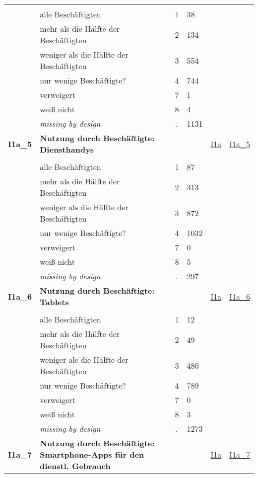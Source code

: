 \begin{longtable}{| L{2.45cm} | L{6cm} | C{1.5cm} | R{1cm} | C{2.25cm} | C{2.25cm} |}
   &  &  &  &  &  \\ 
   & alle Beschäftigten & 1 & 38 &  &  \\ 
   & mehr als die Hälfte der Beschäftigten & 2 & 134 &  &  \\ 
   & weniger als die Hälfte der Beschäftigten & 3 & 554 &  &  \\ 
   & nur wenige Beschäftigte? & 4 & 744 &  &  \\ 
   & verweigert & 7 & 1 &  &  \\ 
   & weiß nicht & 8 & 4 &  &  \\ 
   & \textit{missing by design} & \textit{.} & 1131 &  &  \\ 
   \midrule
\textbf{I1a\_5}\label{var:I1a:5} & \textbf{Nutzung durch Beschäftigte: Diensthandys} &  &  & \hyperref[I1a]{I1a} & \hyperref[var:suf:I1a:5]{I1a\_5} \\ 
   &  &  &  &  &  \\ 
   & alle Beschäftigten & 1 & 87 &  &  \\ 
   & mehr als die Hälfte der Beschäftigten & 2 & 313 &  &  \\ 
   & weniger als die Hälfte der Beschäftigten & 3 & 872 &  &  \\ 
   & nur wenige Beschäftigte? & 4 & 1032 &  &  \\ 
   & verweigert & 7 & 0 &  &  \\ 
   & weiß nicht & 8 & 5 &  &  \\ 
   & \textit{missing by design} & \textit{.} & 297 &  &  \\ 
   \midrule
\textbf{I1a\_6}\label{var:I1a:6} & \textbf{Nutzung durch Beschäftigte: Tablets} &  &  & \hyperref[I1a]{I1a} & \hyperref[var:suf:I1a:6]{I1a\_6} \\ 
   &  &  &  &  &  \\ 
   & alle Beschäftigten & 1 & 12 &  &  \\ 
   & mehr als die Hälfte der Beschäftigten & 2 & 49 &  &  \\ 
   & weniger als die Hälfte der Beschäftigten & 3 & 480 &  &  \\ 
   & nur wenige Beschäftigte? & 4 & 789 &  &  \\ 
   & verweigert & 7 & 0 &  &  \\ 
   & weiß nicht & 8 & 3 &  &  \\ 
   & \textit{missing by design} & \textit{.} & 1273 &  &  \\ 
   \midrule
\textbf{I1a\_7}\label{var:I1a:7} & \textbf{Nutzung durch Beschäftigte: Smartphone-Apps für den dienstl. Gebrauch} &  &  & \hyperref[I1a]{I1a} & \hyperref[var:suf:I1a:7]{I1a\_7} \\ 

\end{longtable}
